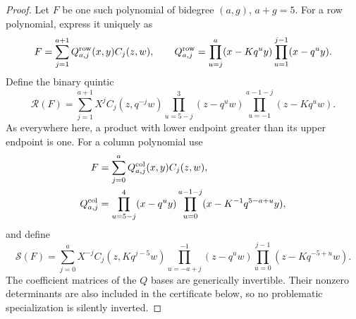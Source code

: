 \documentclass[11pt,a4paper]{article}
\theoremstyle{definition}\newtheorem{definition}{Definition}
\begin{document}
\begin{proof}
Let $F$ be one such polynomial of bidegree $(a,g)$, $a+g=5$.
For a row polynomial, express it uniquely as
\begin{equation}\label{R20:rowbasis}
 F=\sum_{j=1}^{a+1} Q^{\rm row}_{a,j}(x,y) C_j(z,w),\qquad
 Q^{\rm row}_{a,j}=
 \prod_{u=j}^{a}(x-Kq^uy)\prod_{u=1}^{j-1}(x-q^uy).
\end{equation}
Define the binary quintic
\begin{equation}\label{R20:rowtransform}
 \mathcal R(F)=\sum_{j=1}^{a+1}X^j C_j(z,q^{-j}w)
       \prod_{u=5-j}^{3}(z-q^uw)
       \prod_{u=-1}^{a-1-j}(z-Kq^uw).
\end{equation}
As everywhere here, a product with lower endpoint greater than its
upper endpoint is one. For a column polynomial use
\begin{equation}\label{R20:colbasis}
 \begin{split}
 F&=\sum_{j=0}^{a}Q^{\rm col}_{a,j}(x,y)C_j(z,w),\\
 Q^{\rm col}_{a,j}&=
 \prod_{u=5-j}^{4}(x-q^uy)
 \prod_{u=0}^{a-1-j}(x-K^{-1}q^{5-a+u}y),
 \end{split}
\end{equation}
and define
\begin{equation}\label{R20:coltransform}
 \mathcal S(F)=\sum_{j=0}^{a}X^{-j}C_j(z,Kq^{j-5}w)
       \prod_{u=-a+j}^{-1}(z-q^uw)
       \prod_{u=0}^{j-1}(z-Kq^{-5+u}w).
\end{equation}
The coefficient matrices of the $Q$ bases are generically invertible.
Their nonzero determinants are also included in the certificate below,
so no problematic specialization is silently inverted.


\end{proof}
\end{document}
